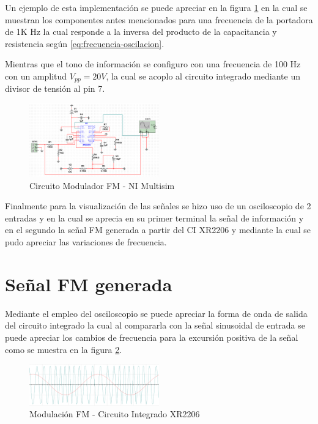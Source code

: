 \documentclass[conference]{IEEEtran}
\begin{document}
	Un ejemplo de esta implementación se puede apreciar en la figura \ref{fig:simulacion-xr2206} en la cual se muestran los componentes antes mencionados para una frecuencia de la portadora de 1K Hz la cual responde a la inversa del producto de la capacitancia y resistencia según \ref{eq:frecuencia-oscilacion}.
	
	Mientras que el tono de información se configuro con una frecuencia de 100 Hz con un amplitud $V_{pp} = 20V$, la cual se acoplo al circuito integrado mediante un divisor de tensión al pin 7.
	
	
	\begin{figure}[h]
		\centering
		\includegraphics[width=0.5\textwidth]{media/simulacion-xr2206}
		\caption{Circuito Modulador FM - NI Multisim}
		\label{fig:simulacion-xr2206}
	\end{figure}
	
	Finalmente para la visualización de las señales se hizo uso de un osciloscopio de 2 entradas y en la cual se aprecia en su primer terminal la señal de información y en el segundo la señal FM generada a partir del CI XR2206 y mediante la cual se pudo apreciar las variaciones de frecuencia.
	
	\section{Señal FM generada}
	
	Mediante el empleo del osciloscopio se puede apreciar la forma de onda de salida del circuito integrado la cual al compararla con la señal sinusoidal de entrada se puede apreciar los cambios de frecuencia para la excursión positiva de la señal como se muestra en la figura \ref{fig:mod-fm-circuito}.
	
	\begin{figure}[h]
		\centering
		\includegraphics[width=0.5\textwidth]{media/mod-fm-circuito}
		\caption{Modulación FM - Circuito Integrado XR2206}
		\label{fig:mod-fm-circuito}
	\end{figure}
	
\end{document}
